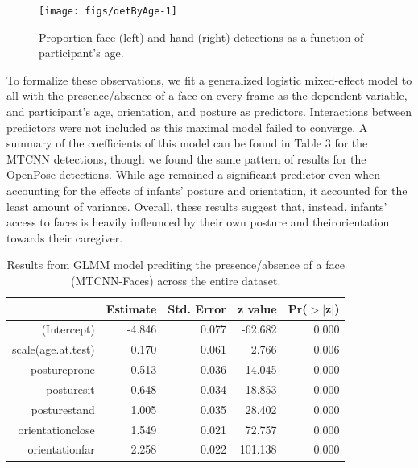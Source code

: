 \documentclass[10pt, letterpaper]{article}
\newenvironment{CodeChunk}{}{}
\begin{document}
\begin{CodeChunk}
\begin{figure}[h]

{\centering \texttt{[image: figs/detByAge-1]} 

}

\caption[Proportion face (left) and hand (right) detections as a function of participant's age]{Proportion face (left) and hand (right) detections as a function of participant's age.}\label{fig:detByAge}
\end{figure}
\end{CodeChunk}

To formalize these observations, we fit a generalized logistic
mixed-effect model to all with the presence/absence of a face on every
frame as the dependent variable, and participant's age, orientation, and
posture as predictors. Interactions between predictors were not included
as this maximal model failed to converge. A summary of the coefficients
of this model can be found in Table 3 for the MTCNN detections, though
we found the same pattern of results for the OpenPose detections. While
age remained a significant predictor even when accounting for the
effects of infants' posture and orientation, it accounted for the least
amount of variance. Overall, these results suggest that, instead,
infants' access to faces is heavily infleunced by their own posture and
theirorientation towards their caregiver.

\begin{table}[H]
\centering
\begin{tabular}{rrrrr}
  \hline
 & Estimate & Std. Error & z value & Pr($>$$|$z$|$) \\ 
  \hline
(Intercept) & -4.846 & 0.077 & -62.682 & 0.000 \\ 
  scale(age.at.test) & 0.170 & 0.061 & 2.766 & 0.006 \\ 
  postureprone & -0.513 & 0.036 & -14.045 & 0.000 \\ 
  posturesit & 0.648 & 0.034 & 18.853 & 0.000 \\ 
  posturestand & 1.005 & 0.035 & 28.402 & 0.000 \\ 
  orientationclose & 1.549 & 0.021 & 72.757 & 0.000 \\ 
  orientationfar & 2.258 & 0.022 & 101.138 & 0.000 \\ 
   \hline
\end{tabular}
\caption{Results from GLMM model prediting the presence/absence of a face (MTCNN-Faces) across the entire dataset.} 
\end{table}
\end{document}
